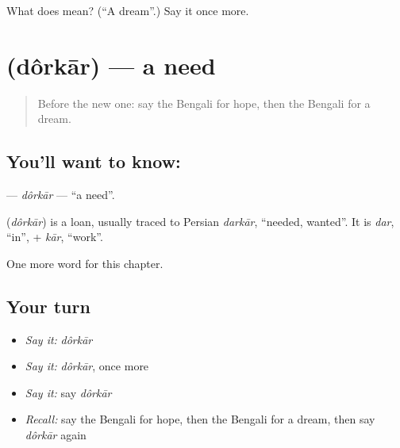 \begin{tcolorbox}[breakable,colback=teal!4,colframe=teal!35!black,title={Before you move on}]
What does  mean? (\textquotedblleft{}A dream\textquotedblright{}.) Say it once more.
\end{tcolorbox}
\section[\texorpdfstring{\bn{দরকার} (dôrkār)}{দরকার (dôrkār)}]{ (dôrkār) — a need}

\label{lesson:BN-C96-dorkar}



\begin{quote}
Before the new one: say the Bengali for hope, then the Bengali for a dream.
\end{quote}

\subsection*{You'll want to know: }
\textbf{} — \emph{dôrkār} — \textquotedblleft{}a need\textquotedblright{}.

\begin{cousinweb}
\textbf{} (\emph{dôrkār}) is a loan, usually traced to Persian \emph{darkār}, \textquotedblleft{}needed, wanted\textquotedblright{}. It is \emph{dar}, \textquotedblleft{}in\textquotedblright{}, + \emph{kār}, \textquotedblleft{}work\textquotedblright{}.
\end{cousinweb}

\begin{grammarlens}[title={What you've built}]
One more word for this chapter.
\end{grammarlens}

\subsection*{Your turn}
\begin{itemize}
\raggedright
  \item \emph{Say it:} \emph{dôrkār}
  \item \emph{Say it:} \emph{dôrkār}, once more
  \item \emph{Say it:} say \emph{dôrkār}
  \item \emph{Recall:} say the Bengali for hope, then the Bengali for a dream, then say \emph{dôrkār} again
\end{itemize}

